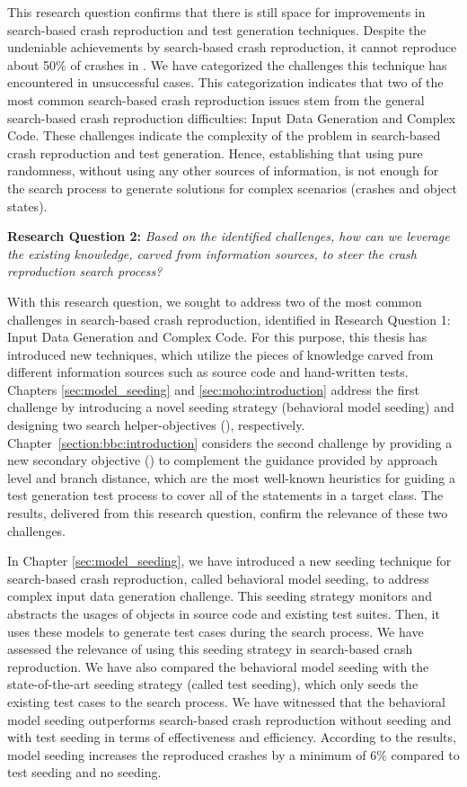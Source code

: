 This research question confirms that there is still space for improvements in search-based crash reproduction and test generation techniques. Despite the undeniable achievements by search-based crash reproduction, it cannot reproduce about 50\% of crashes in \crashpack. 
We have categorized the challenges this technique has encountered in unsuccessful cases. This categorization indicates that two of the most common search-based crash reproduction issues stem from the general search-based crash reproduction difficulties: Input Data Generation and Complex Code. These challenges indicate the complexity of the problem in search-based crash reproduction and test generation. Hence, establishing that using pure randomness, without using any other sources of information, is not enough for the search process to generate solutions for complex scenarios (crashes and object states).


\textbf{Research Question 2: }\textit{Based on the identified challenges, how can we leverage the existing knowl\-edge, carved from information sources, to steer the crash reproduction search process?}


With this research question, we sought to address two of the most common challenges in search-based crash reproduction, identified in Research Question 1: Input Data Generation and Complex Code. For this purpose, this thesis has introduced new techniques, which utilize the pieces of knowledge carved from different information sources such as source code and hand-written tests. 
Chapters \ref{sec:model_seeding} and \ref{sec:moho:introduction} address the first challenge by introducing a novel seeding strategy (behavioral model seeding) and designing two search helper-objectives (\moho), respectively. 
Chapter~\ref{section:bbc:introduction} considers the second challenge by providing a new secondary objective (\bbc) to complement the guidance provided by approach level and branch distance, which are the most well-known heuristics for guiding a test generation test process to cover all of the statements in a target class.
The results, delivered from this research question, confirm the relevance of these two challenges.



In Chapter \ref{sec:model_seeding}, we have introduced a new seeding technique for search-based crash reproduction, called behavioral model seeding, to address complex input data generation challenge. This seeding strategy monitors and abstracts the usages of objects in source code and existing test suites. Then, it uses these models to generate test cases during the search process.
We have assessed the relevance of using this seeding strategy in search-based crash reproduction. We have also compared the behavioral model seeding with the state-of-the-art seeding strategy (called test seeding), which only seeds the existing test cases to the search process. We have witnessed that the behavioral model seeding outperforms search-based crash reproduction without seeding and with test seeding in terms of effectiveness and efficiency. According to the results, model seeding increases the reproduced crashes by a minimum of 6\% compared to test seeding and no seeding.

